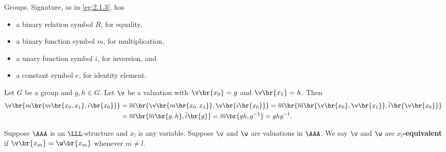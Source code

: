 \begin{example*}
Groups. Signature, as in \ref{eg:2.1.3}, has
\begin{itemize}
\item a binary relation symbol $ R $, for equality,
\item a binary function symbol $ m $, for multiplication,
\item a unary function symbol $ i $, for inversion, and
\item a constant symbol $ e $, for identity element.
\end{itemize}
Let $ G $ be a group and $ g, h \in G $. Let $ \v $ be a valuation with $ \v\br{x_0} = g $ and $ \v\br{x_1} = h $. Then
\begin{align*}
\v\br{m\br{m\br{x_0, x_1}, i\br{x_0}}}
& = \overline{m}\br{\v\br{m\br{x_0, x_1}}, \v\br{i\br{x_0}}}
= \overline{m}\br{\overline{m}\br{\v\br{x_0}, \v\br{x_1}}, \overline{i}\br{\v\br{x_0}}} \\
& = \overline{m}\br{\overline{m}\br{g, h}, \overline{i}\br{g}}
= \overline{m}\br{gh, g^{-1}}
= ghg^{-1}.
\end{align*}
\end{example*}

\begin{definition}
Suppose $ \AAA $ is an $ \LLL $-structure and $ x_l $ is any variable. Suppose $ \v $ and $ \w $ are valuations in $ \AAA $. We say $ \v $ and $ \w $ are \textbf{$ x_l $-equivalent} if $ \v\br{x_m} = \w\br{x_m} $ whenever $ m \ne l $.
\end{definition}

